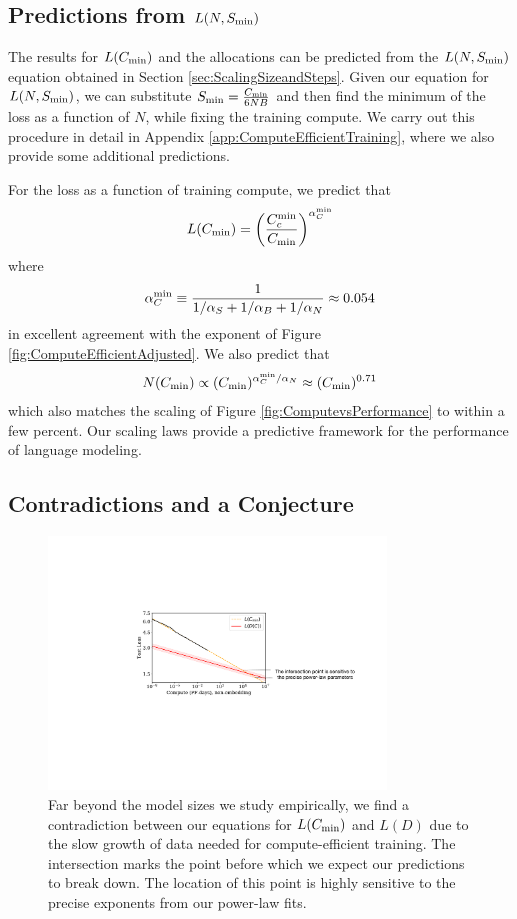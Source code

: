 \documentclass[english]{article}
\newcommand{\be}{\begin{equation}}
\newcommand{\ee}{\end{equation}}
\begin{document}
\subsection{Predictions from $L(N, S_{\rm min})$}

The results for $L(C_{\rm min})$ and the allocations can be predicted  from the $L(N, S_{\rm min})$ equation obtained in Section \ref{sec:ScalingSizeandSteps}.  Given our  equation for $L(N, S_{\rm min})$, we can substitute $S_{\rm min} = \frac{C_{\rm min}}{6 N B}$ and then find the minimum of the loss as a function of $N$, while fixing the training compute.  
We carry out this procedure in detail  in Appendix \ref{app:ComputeEfficientTraining}, where we also provide some additional predictions.  

For the loss as a function of training compute, we predict that
\be
L(C_{\rm min}) = \left( \frac{C_c^{\rm min}}{C_{\rm min}} \right)^{\alpha_C^{\rm min}}
\ee
where
\be
\alpha_C^{\rm min} \equiv \frac{1}{1/\alpha_S + 1/\alpha_B + 1/\alpha_N} \approx 0.054
\ee
in excellent agreement with the exponent of Figure \ref{fig:ComputeEfficientAdjusted}.  We also predict that
\be
N(C_{\rm min}) \propto (C_{\rm min})^{\alpha_C^{\rm min} / \alpha_N} \approx  (C_{\rm min})^{0.71}
\ee
which also matches the scaling of Figure \ref{fig:ComputevsPerformance} to within a few percent.  Our scaling laws provide a predictive framework for the performance of language modeling.

\subsection{Contradictions and a Conjecture}
\begin{figure}
\noindent \centering{}
\includegraphics[width=0.8\textwidth]{Contradiction}
\caption[Contradiction between compute and data trends]{Far beyond the model sizes we study empirically, we find a contradiction between our equations for $L(C_{\rm min})$ and $L(D)$ due to the slow growth of data needed for compute-efficient training.  The intersection marks the point before which we expect our predictions to break down.  The location of this point is highly sensitive to the precise exponents from our power-law fits. \label{fig:Contradiction}}
\end{figure}
\end{document}
